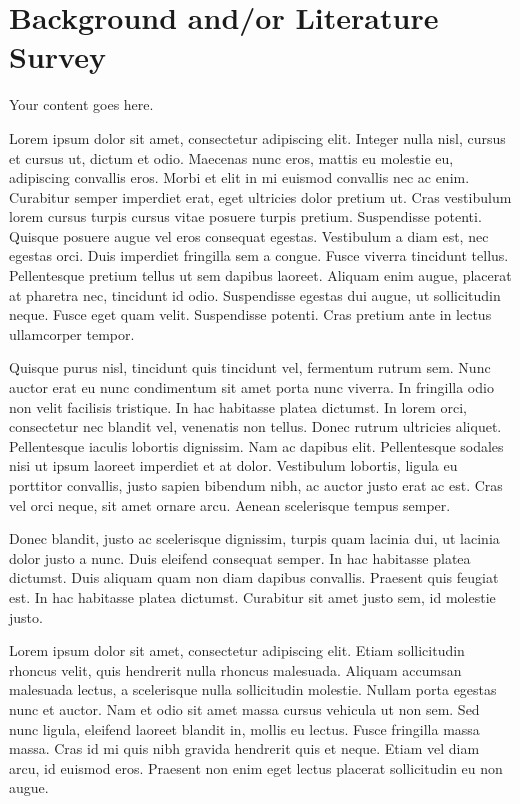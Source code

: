 \documentclass[12pt,lot,lof]{quthesis}
\begin{document}
\chapter{Background and/or Literature Survey}
Your content goes here.

Lorem ipsum dolor sit amet, consectetur adipiscing elit. Integer nulla nisl, cursus et cursus ut, dictum et odio. Maecenas nunc eros, mattis eu molestie eu, adipiscing convallis eros. Morbi et elit in mi euismod convallis nec ac enim. Curabitur semper imperdiet erat, eget ultricies dolor pretium ut. Cras vestibulum lorem cursus turpis cursus vitae posuere turpis pretium. Suspendisse potenti. Quisque posuere augue vel eros consequat egestas. Vestibulum a diam est, nec egestas orci. Duis imperdiet fringilla sem a congue. Fusce viverra tincidunt tellus. Pellentesque pretium tellus ut sem dapibus laoreet. Aliquam enim augue, placerat at pharetra nec, tincidunt id odio. Suspendisse egestas dui augue, ut sollicitudin neque. Fusce eget quam velit. Suspendisse potenti. Cras pretium ante in lectus ullamcorper tempor.

Quisque purus nisl, tincidunt quis tincidunt vel, fermentum rutrum sem. Nunc auctor erat eu nunc condimentum sit amet porta nunc viverra. In fringilla odio non velit facilisis tristique. In hac habitasse platea dictumst. In lorem orci, consectetur nec blandit vel, venenatis non tellus. Donec rutrum ultricies aliquet. Pellentesque iaculis lobortis dignissim. Nam ac dapibus elit. Pellentesque sodales nisi ut ipsum laoreet imperdiet et at dolor. Vestibulum lobortis, ligula eu porttitor convallis, justo sapien bibendum nibh, ac auctor justo erat ac est. Cras vel orci neque, sit amet ornare arcu. Aenean scelerisque tempus semper.

Donec blandit, justo ac scelerisque dignissim, turpis quam lacinia dui, ut lacinia dolor justo a nunc. Duis eleifend consequat semper. In hac habitasse platea dictumst. Duis aliquam quam non diam dapibus convallis. Praesent quis feugiat est. In hac habitasse platea dictumst. Curabitur sit amet justo sem, id molestie justo.

Lorem ipsum dolor sit amet, consectetur adipiscing elit. Etiam sollicitudin rhoncus velit, quis hendrerit nulla rhoncus malesuada. Aliquam accumsan malesuada lectus, a scelerisque nulla sollicitudin molestie. Nullam porta egestas nunc et auctor. Nam et odio sit amet massa cursus vehicula ut non sem. Sed nunc ligula, eleifend laoreet blandit in, mollis eu lectus. Fusce fringilla massa massa. Cras id mi quis nibh gravida hendrerit quis et neque. Etiam vel diam arcu, id euismod eros. Praesent non enim eget lectus placerat sollicitudin eu non augue.
\end{document}
